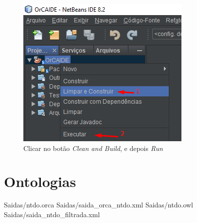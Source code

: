 \documentclass{bcc}
\begin{document}
\begin{figure}[H]
\centering
\includegraphics[width=.6\textwidth]{Figuras/install6.png}
\caption{Clicar no botão \textit{Clean and Build}, e depois \textit{Run}} 
\label{fig:install6}
\end{figure}

\chapter{Ontologias} 
\label{chap:apOntologia}
 {Saidas/ntdo.orca}
 {Saidas/saida_orca_ntdo.xml}
 {Saidas/ntdo.owl}
 {Saidas/saida_ntdo_filtrada.xml}
\end{document}
